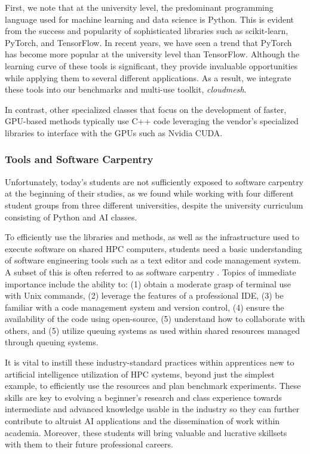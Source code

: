 \documentclass[utf8]{FrontiersinVancouver} %
\begin{document}
First, we note that at the university level, the predominant programming language used for machine learning and data science is Python. This is evident from the success and popularity of sophisticated libraries such as scikit-learn, PyTorch, and TensorFlow. In recent years, we have seen a trend that PyTorch has become more popular at the university level than TensorFlow. Although the learning curve of these tools is significant, they provide invaluable opportunities while applying them to several different applications. As a result, we integrate these tools into our benchmarks and multi-use toolkit, {\em cloudmesh}.

In contrast, other specialized classes that focus on the development of faster, GPU-based methods typically use C++ code leveraging the vendor's specialized libraries to interface with the GPUs such as Nvidia CUDA.



\subsubsection{Tools and Software Carpentry}\label{sec:tools}

Unfortunately, today's students are not sufficiently exposed to software carpentry at the beginning of their studies, as we found while working with four different student groups from three different universities, despite the university curriculum consisting of Python and AI classes. 

To efficiently use the libraries and methods, as well as the infrastructure used to execute software on shared HPC computers, students need a basic understanding of software engineering tools such as a text editor and code management system. A subset of this is often referred to as software carpentry \cite{software-carpentry}. Topics of immediate importance include the ability to: (1)
 obtain a moderate grasp of terminal use with Unix commands,
(2) leverage the features of a professional IDE,
(3) be familiar with a code management system and version control,
(4) ensure the availability of the code using open-source, 
(5) understand how to collaborate with others, and (5) utilize queuing systems as used within shared resources managed through queuing systems. 

It is vital to instill these industry-standard practices within apprentices new to artificial intelligence utilization of HPC systems, beyond just the simplest example, to efficiently use the resources and plan benchmark experiments. These skills are key to evolving a beginner's research and class experience towards intermediate and advanced knowledge usable in the industry so they can further contribute to altruist AI applications and the dissemination of work within academia. Moreover, these students will bring valuable and lucrative skillsets with them to their future professional careers.
\end{document}
